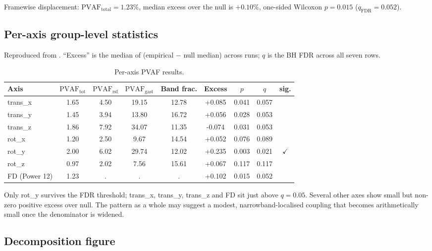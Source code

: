 \documentclass[11pt]{article}
\newcommand{\PVAF}{\mathrm{PVAF}}
\begin{document}
Framewise displacement: $\PVAF_{\text{total}} = 1.23\%$, median excess
over the null is $+0.10\%$, one-sided Wilcoxon $p = 0.015$
($q_{\text{FDR}} = 0.052$).

\subsection{Per-axis group-level statistics}

Reproduced from . ``Excess'' is the
median of (empirical $-$ null median) across runs; $q$ is the BH FDR
across all seven rows.

\begin{table}[h!]
\centering
\small
\caption{Per-axis PVAF results.}
\begin{tabular}{l
    S[table-format=1.2]
    S[table-format=1.2]
    S[table-format=2.2]
    S[table-format=2.2]
    S[table-format=+1.3]
    S[table-format=1.3]
    S[table-format=1.3] c}
\toprule
Axis &
{$\PVAF_{\text{tot}}$} &
{$\PVAF_{\text{rsf}}$} &
{$\PVAF_{\text{gast}}$} &
{Band frac.} &
{Excess} &
{$p$} &
{$q$} &
sig.\\
\midrule
trans\_x      & 1.65 & 4.50 & 19.15 & 12.78 & +0.085 & 0.041 & 0.057 &  \\
trans\_y      & 1.45 & 3.94 & 13.80 & 16.72 & +0.056 & 0.028 & 0.053 &  \\
trans\_z      & 1.86 & 7.92 & 34.07 & 11.35 & -0.074 & 0.031 & 0.053 &  \\
rot\_x        & 1.20 & 2.50 &  9.67 & 14.54 & +0.052 & 0.076 & 0.089 &  \\
rot\_y        & 2.00 & 6.02 & 29.74 & 12.02 & +0.235 & 0.003 & 0.021 & $\checkmark$ \\
rot\_z        & 0.97 & 2.02 &  7.56 & 15.61 & +0.067 & 0.117 & 0.117 &  \\
FD (Power 12) & 1.23 & {.}  & {.}   & {.}   & +0.102 & 0.015 & 0.052 &  \\
\bottomrule
\end{tabular}
\label{tab:per_axis}
\end{table}

Only rot\_y survives the FDR threshold; trans\_x, trans\_y, trans\_z
and FD sit just above $q = 0.05$. Several other axes show small but
non-zero positive excess over null. The pattern as a whole may suggest
a modest, narrowband-localised coupling that becomes arithmetically
small once the denominator is widened.

\subsection{Decomposition figure}
\end{document}

